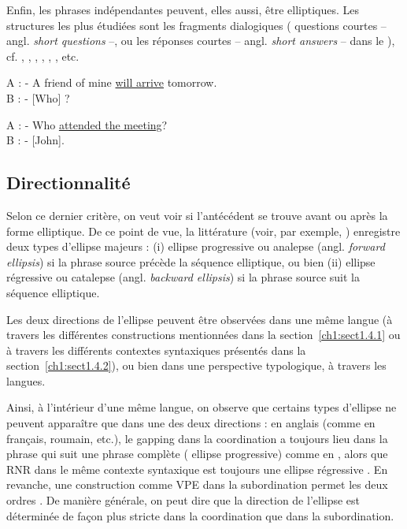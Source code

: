 Enfin, les phrases indépendantes peuvent, elles aussi, être elliptiques. Les structures les plus étudiées sont les fragments dialogiques ({\cad} questions courtes  – angl. \textit{short questions} –, ou les réponses courtes  – angl. \textit{short answers} – dans le ), cf. \citet{Barton1990}, \citet{GinzburgEtAl2000}, \citet{Schlangen2003}, \citet{Merchant2004}, \citet{FernandezRovira2006}, \citet{Ginzburg2012}, etc.  

\ea 
A : - A friend of mine \uline{will arrive} tomorrow. \label{ch1:ex89} \\
B : - [Who] ?  
\z

\ea 
A : - Who \uline{attended the meeting}? \label{ch1:ex90} \\
B : - [John].  
\z


\subsection{Directionnalité} \label{ch1:sect1.4.3}

Selon ce dernier critère, on veut voir si l’antécédent se trouve avant ou après la forme elliptique. De ce point de vue, la littérature (voir, par exemple, \citealt{Haspelmath2007}) enregistre deux types d’ellipse majeurs : (i) ellipse progressive ou analepse (angl. \textit{forward ellipsis}) si la phrase source précède la séquence elliptique, ou bien (ii) ellipse régressive ou catalepse (angl. \textit{backward ellipsis}) si la phrase source suit la séquence elliptique.

Les deux directions de l’ellipse peuvent être observées dans une même langue (à travers les différentes constructions mentionnées dans la section~\ref{ch1:sect1.4.1} ou à travers les différents contextes syntaxiques présentés dans la section~\ref{ch1:sect1.4.2}), ou bien dans une perspective typologique, à travers les langues. 

Ainsi, à l’intérieur d’une même langue, on observe que certains types d’ellipse ne peuvent apparaître que dans une des deux directions : en anglais (comme en français, roumain, etc.), le gapping dans la coordination a toujours lieu dans la phrase qui suit une phrase complète ({\cad} ellipse progressive) comme en , alors que RNR dans le même contexte syntaxique est toujours une ellipse régressive . En revanche, une construction comme VPE dans la subordination permet les deux ordres . De manière générale, on peut dire que la direction de l’ellipse est déterminée de façon plus stricte dans la coordination que dans la subordination. 

